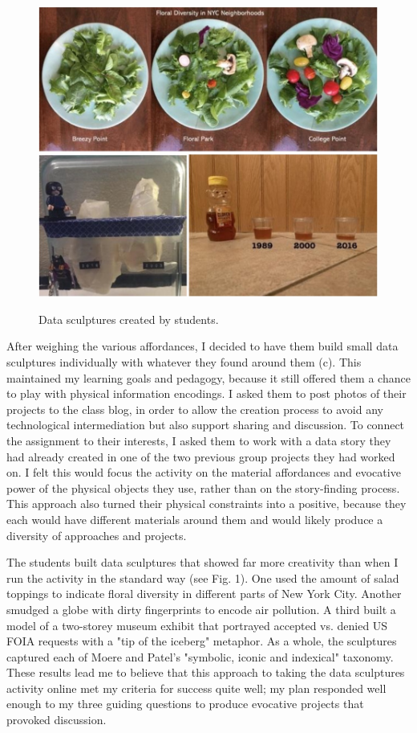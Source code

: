 \documentclass[journal]{vgtc}                %
\begin{document}
\begin{figure}[h]
  \centering
  \includegraphics[scale=0.26]{figures/figure1.jpg}
  \label{fig:data_sculpture_examples}
  \caption{Data sculptures created by students.}
\end{figure}

After weighing the various affordances, I decided to have them build small data sculptures individually with whatever they found around them (c). This maintained my learning goals and pedagogy, because it still offered them a chance to play with physical information encodings. I asked them to post photos of their projects to the class blog, in order to allow the creation process to avoid any technological intermediation but also support sharing and discussion.  To connect the assignment to their interests, I asked them to work with a data story they had already created in one of the two previous group projects they had worked on. I felt this would focus the activity on the material affordances and evocative power of the physical objects they use, rather than on the story-finding process. This approach also turned their physical constraints into a positive, because they each would have different materials around them and would likely produce a diversity of approaches and projects.

The students built  data sculptures that showed far more creativity than when I run the activity in the standard way (see Fig. 1). One used the amount of salad toppings to indicate floral diversity in different parts of New York City. Another smudged a globe with dirty fingerprints to encode air pollution. A third built a model of a two-storey museum exhibit that portrayed accepted vs. denied US FOIA requests with a "tip of the iceberg" metaphor. As a whole, the sculptures captured each of Moere and Patel's "symbolic, iconic and indexical" taxonomy\cite{moere_physical_2009}. These results lead me to believe that this approach to taking the data sculptures activity online met my criteria for success quite well; my plan responded well enough to my three guiding questions to produce evocative projects that provoked discussion.
\end{document}
